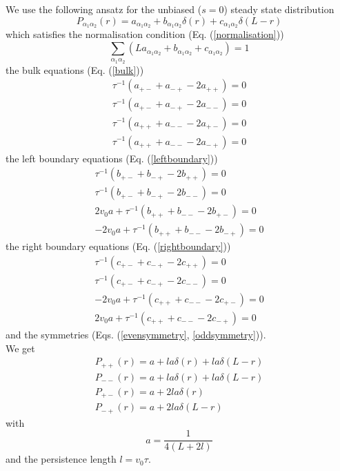 \documentclass[pre,aps,superscriptaddress,nofootinbib]{revtex4}
\begin{document}
We use the following ansatz for the unbiased ($s = 0$) steady state distribution
\begin{equation}
P_{\alpha_1\alpha_2}(r) = a_{\alpha_1\alpha_2} + b_{\alpha_1\alpha_2} \delta(r) + c_{\alpha_1\alpha_2} \delta(L - r)
\end{equation}
which satisfies the normalisation condition (Eq. (\ref{normalisation}))
\begin{equation}
\sum_{\alpha_1\alpha_2} \left(L a_{\alpha_1\alpha_2} + b_{\alpha_1\alpha_2} + c_{\alpha_1\alpha_2}\right) = 1
\end{equation}
the bulk equations (Eq. (\ref{bulk}))
\begin{eqnarray}
\tau^{-1} (a_{+-} + a_{-+} - 2 a_{++}) = 0\\
\tau^{-1} (a_{+-} + a_{-+} - 2 a_{--}) = 0\\
\tau^{-1} (a_{++} + a_{--} - 2 a_{+-}) = 0\\
\tau^{-1} (a_{++} + a_{--} - 2 a_{-+}) = 0
\end{eqnarray}
the left boundary equations (Eq. (\ref{leftboundary}))
\begin{eqnarray}
\tau^{-1}(b_{+-} + b_{-+} - 2 b_{++}) = 0\\
\tau^{-1}(b_{+-} + b_{-+} - 2 b_{--}) = 0\\
2 v_0 a + \tau^{-1}(b_{++} + b_{--} - 2 b_{+-}) = 0\\
- 2 v_0 a + \tau^{-1}(b_{++} + b_{--} - 2 b_{-+}) = 0
\end{eqnarray}
the right boundary equations (Eq. (\ref{rightboundary}))
\begin{eqnarray}
\tau^{-1}(c_{+-} + c_{-+} - 2 c_{++}) = 0\\
\tau^{-1}(c_{+-} + c_{-+} - 2 c_{--}) = 0\\
- 2 v_0 a + \tau^{-1}(c_{++} + c_{--} - 2 c_{+-}) = 0\\
2 v_0 a + \tau^{-1}(c_{++} + c_{--} - 2 c_{-+}) = 0
\end{eqnarray}
and the symmetries (Eqs. (\ref{evensymmetry}, \ref{oddsymmetry})).\\

We get
\begin{eqnarray}
P_{++}(r) = a + l a \delta(r) + l a \delta(L - r)\\
P_{--}(r) = a + l a \delta(r) + l a \delta(L - r)\\
P_{+-}(r) = a + 2 l a \delta(r)\\
P_{-+}(r) = a + 2 l a \delta(L - r)
\end{eqnarray}
with
\begin{equation}
a = \frac{1}{4(L + 2l)}
\end{equation}
and the persistence length $l = v_0 \tau$.
\end{document}
